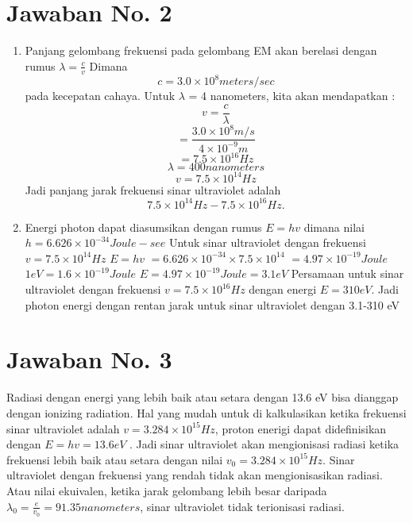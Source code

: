 \section{Jawaban No. 2}
\begin{enumerate}
\item Panjang gelombang frekuensi pada gelombang EM akan berelasi dengan rumus $\lambda =  \frac{c}{v}$
\subitem Dimana \begin{displaymath} \mathit{c} = 3.0 \times 10^{8} meters/sec \end{displaymath} pada kecepatan cahaya. Untuk $\lambda$ = 4 nanometers, kita akan mendapatkan :
\subitem  $$ v =\frac{c}{\lambda}$$
\subitem  $$ = \frac{ 3.0 \times 10^{8}m/s}{4 \times 10^{-9}m}$$
\subitem \begin{displaymath}= 7.5 \times 10^{16}Hz\end{displaymath}
\subitem$$\lambda = 400{nanometers}$$ 
\subitem \begin{displaymath}v = 7.5 \times 10^{14}Hz\end{displaymath}
\subitem Jadi panjang jarak frekuensi sinar ultraviolet adalah
\begin{displaymath}
7.5 \times 10^{14}Hz - 7.5 \times 10^{16}Hz.
\end{displaymath}
\item Energi photon dapat diasumsikan dengan rumus $E = hv$ dimana nilai $h = 6.626 \times 10^{-34} Joule-see$ Untuk sinar ultraviolet dengan frekuensi $v = 7.5 \times 10^{14}Hz$
\subitem$E = hv$
\subitem $=  6.626 \times 10^{-34} \times 7.5 \times 10^{14}$
\subitem $=  4.97 \times 10^{-19} Joule$
\subitem $1 eV = 1.6 \times 10^{-19} Joule$
\subitem $E = 4.97 \times 10^{-19} Joule = 3.1 eV$
\subitem Persamaan untuk sinar ultraviolet dengan frekuensi $v = 7.5 \times 10^{16}Hz$ dengan energi $E = 310 eV$. Jadi photon energi dengan rentan jarak untuk sinar ultraviolet dengan 3.1-310 eV 
\end{enumerate}

\section{Jawaban No. 3}
Radiasi dengan energi yang lebih baik atau setara dengan 13.6 eV bisa dianggap dengan ionizing radiation. Hal yang mudah untuk di kalkulasikan ketika frekuensi sinar ultraviolet adalah $v = 3.284 \times 10^{15} Hz$, proton enerigi dapat didefinisikan dengan $E = hv = 13.6 eV$ . Jadi sinar ultraviolet akan mengionisasi radiasi ketika frekuensi lebih baik atau setara dengan nilai $v_{0} = 3.284 \times 10^{15}Hz$. Sinar ultraviolet dengan frekuensi yang rendah tidak akan mengionisasikan radiasi. Atau nilai ekuivalen, ketika jarak gelombang lebih besar daripada $\lambda_{0} = \frac{e}{v_{0}} = 91.35 nanometers$, sinar ultraviolet tidak terionisasi radiasi. 